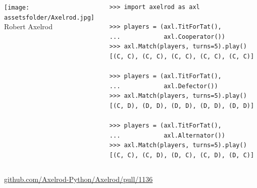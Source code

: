 \documentclass{beamer}
\newcommand{\assetsfolder}{./assets}
\newcommand{\mlresearchfolder}{$HOME/rsc/ml-paper}
\begin{document}
    \begin{frame}[fragile]{}
        \begin{columns}
            \begin{column}{.4\textwidth}
                \begin{center}
                    \texttt{[image: \\assetsfolder/Axelrod.jpg]}
                    \\
                    Robert Axelrod
                \end{center}
            \end{column}
            \pause
            \begin{column}{.6\textwidth}
                \begin{verbatim}
>>> import axelrod as axl

>>> players = (axl.TitForTat(),
...            axl.Cooperator())
>>> axl.Match(players, turns=5).play()
[(C, C), (C, C), (C, C), (C, C), (C, C)]

>>> players = (axl.TitForTat(),
...            axl.Defector())
>>> axl.Match(players, turns=5).play()
[(C, D), (D, D), (D, D), (D, D), (D, D)]

>>> players = (axl.TitForTat(),
...            axl.Alternator())
>>> axl.Match(players, turns=5).play()
[(C, C), (C, D), (D, C), (C, D), (D, C)]

                \end{verbatim}
            \end{column}
        \end{columns}
\end{frame}

    \begin{frame}
        \begin{center}
            \large
            \url{github.com/Axelrod-Python/Axelrod/pull/1136}
        \end{center}
    \end{frame}

\begin{frame}
    \begin{center}
    \scalebox{.7}{
        
    }
    \end{center}
\end{frame}

\begin{frame}
    \begin{center}
    \scalebox{.7}{
        
    }
    \end{center}
\end{frame}
\end{document}
